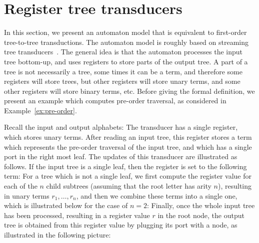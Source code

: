 


\section{Register tree transducers}
\label{sec:stt}
In this section, we present an automaton model that is equivalent to first-order tree-to-tree transductions. 
The automaton model is roughly based on streaming tree transducers~\cite{alur2017streaming}.
The general idea is that the automaton processes the input tree bottom-up, and uses registers to store parts of the output tree. A part of a tree is not necessarily a tree, some times it can be a term, and therefore some registers will store trees, but other registers will store unary terms, and some other registers will store binary terms, etc.  
Before giving the formal definition, we present an example which  computes pre-order traversal, as considered in Example~\ref{ex:pre-order}.
\begin{example}\label{ex:preorder-register} Recall the input and output alphabets:
The transducer has a single register, which stores unary terms. After reading an input tree, this register stores a term which represents the pre-order traversal of the  input tree, and which has a single port in the right most leaf. The updates of this transducer are illustrated as follows. If the input tree is a single leaf, then the register is set to the following term:
    For a tree which is not a single leaf, we first compute the register value  for each of the $n$  child subtrees (assuming that the root letter has arity $n$), resulting in unary terms $r_1,\ldots,r_n$,  and then we combine these terms into a single one, which is illustrated below for the case of $n=2$:
    Finally, once the whole input tree has been processed, resulting in a register value $r$ in the root node, the output tree is obtained from this register value by plugging its port with a node, as illustrated in the following picture:
\end{example}




